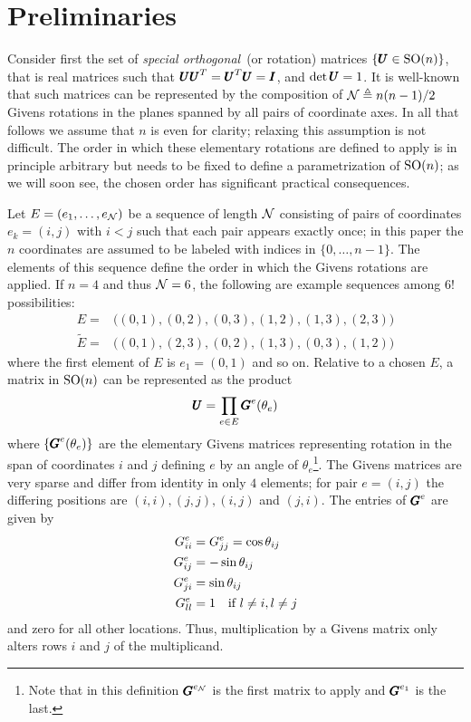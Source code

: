 \documentclass[superscriptaddress,floatfix]{article}
\begin{document}
\section{Preliminaries}
\label{sec:Preliminaries}

Consider first the set of \emph{special orthogonal}~(or rotation) matrices
$\{ {\pmb{U}} \in \textrm{SO}(n) \}$, that is real matrices such that
${\pmb{U}} {\pmb{U}}^T = {\pmb{U}}^T{\pmb{U}} = {\pmb{I}}$, and $\det {\pmb{U}} = 1$. It is well-known
that such matrices can be represented by the composition of
$\mathcal{N} \triangleq n(n-1)/2$ Givens rotations in the planes spanned by
all pairs of coordinate axes. In all that follows we assume that $n$
is even for clarity; relaxing this assumption is not difficult. The
order in which these elementary rotations are defined to apply is in
principle arbitrary but needs to be fixed to define a parametrization
of $\textrm{SO}(n)$; as we will soon see, the chosen order has significant
practical consequences.

Let $E = (e_1, \ldots, e_{\mathcal{N}})$ be a sequence of length $\mathcal{N}$ consisting of
pairs of coordinates $e_k = (i,j)$ with $i<j$ such that each pair
appears exactly once; in this paper the $n$ coordinates are assumed
to be labeled with indices in $\{0,\ldots,n-1\}$. The elements of this
sequence define the order in which the Givens rotations are applied.
If $n=4$ and thus $\mathcal{N}=6$, the following are example sequences among
$6!$ possibilities:
\begin{align}
  E = & \big( (0,1), (0,2), (0,3), (1,2), (1,3), (2,3) \big)\nonumber \\
  \tilde{E} = & \big( (0,1), (2,3), (0,2), (1,3), (0,3), (1,2) \big)
\end{align}
where the first element of $E$ is $e_1 = (0,1)$ and so on. Relative
to a chosen $E$, a matrix in $\textrm{SO}(n)$ can be represented as the product
\begin{align}
  {\pmb{U}} = \prod_{e \in E} {\pmb{G}}^e(\theta_e)
  \label{eq:GivensProdDef}
\end{align}
where $\{ {\pmb{G}}^e(\theta_e)\}$ are the elementary Givens matrices
representing rotation in the span of coordinates $i$ and $j$ defining
$e$ by an angle of $\theta_e$\footnote{Note that in this
  definition ${\pmb{G}}^{e_{\mathcal{N}}}$ is the first matrix to apply and
  ${\pmb{G}}^{e_1}$ is the last.}. The Givens matrices are very sparse
and differ from identity in only $4$ elements; for pair $e = (i,j)$
the differing positions are $(i,i), (j,j), (i,j)$ and $(j,i)$. The
entries of ${\pmb{G}}^e$ are given by
\begin{align}
  G^e_{ii} & = G^e_{jj} = \cos \theta_{ij} \nonumber \\
  G^e_{ij}  & = -\sin \theta_{ij} \nonumber \\
  G^e_{ji}  & =  \sin \theta_{ij} \nonumber \\
  G^e_{ll}  & = 1  \text{\quad if } l \neq i, l \neq j 
\end{align}
and zero for all other locations. Thus, multiplication by a Givens
matrix only alters rows $i$ and $j$ of the multiplicand.
\end{document}
